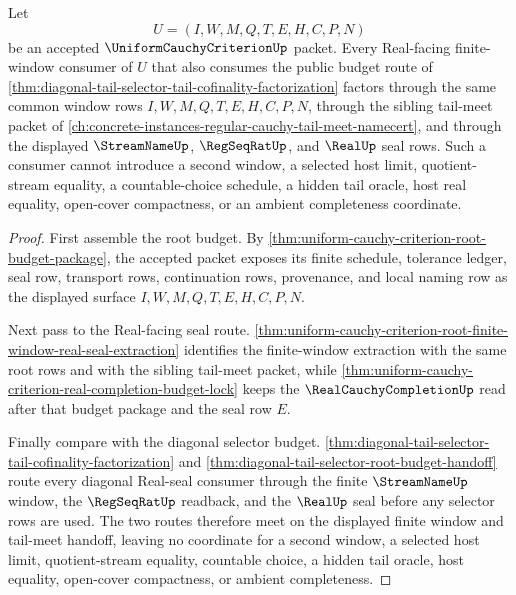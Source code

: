\begin{theorem}
\label{thm:uniform-cauchy-criterion-common-window-exhaustion}
Let
$$
U=(I,W,M,Q,T,E,H,C,P,N)
$$
be an accepted $\UniformCauchyCriterionUp$ packet. Every Real-facing finite-window consumer of $U$ that also consumes the public budget route of \autoref{thm:diagonal-tail-selector-tail-cofinality-factorization} factors through the same common window rows $I,W,M,Q,T,E,H,C,P,N$, through the sibling tail-meet packet of \autoref{ch:concrete-instances-regular-cauchy-tail-meet-namecert}, and through the displayed $\StreamNameUp$, $\RegSeqRatUp$, and $\RealUp$ seal rows. Such a consumer cannot introduce a second window, a selected host limit, quotient-stream equality, a countable-choice schedule, a hidden tail oracle, host real equality, open-cover compactness, or an ambient completeness coordinate.
\end{theorem}
\begin{proof}
First assemble the root budget. By \autoref{thm:uniform-cauchy-criterion-root-budget-package}, the accepted packet exposes its finite schedule, tolerance ledger, seal row, transport rows, continuation rows, provenance, and local naming row as the displayed surface $I,W,M,Q,T,E,H,C,P,N$.

Next pass to the Real-facing seal route. \autoref{thm:uniform-cauchy-criterion-root-finite-window-real-seal-extraction} identifies the finite-window extraction with the same root rows and with the sibling tail-meet packet, while \autoref{thm:uniform-cauchy-criterion-real-completion-budget-lock} keeps the $\RealCauchyCompletionUp$ read after that budget package and the seal row $E$.

Finally compare with the diagonal selector budget. \autoref{thm:diagonal-tail-selector-tail-cofinality-factorization} and \autoref{thm:diagonal-tail-selector-root-budget-handoff} route every diagonal Real-seal consumer through the finite $\StreamNameUp$ window, the $\RegSeqRatUp$ readback, and the $\RealUp$ seal before any selector rows are used. The two routes therefore meet on the displayed finite window and tail-meet handoff, leaving no coordinate for a second window, a selected host limit, quotient-stream equality, countable choice, a hidden tail oracle, host equality, open-cover compactness, or ambient completeness.
\end{proof}

